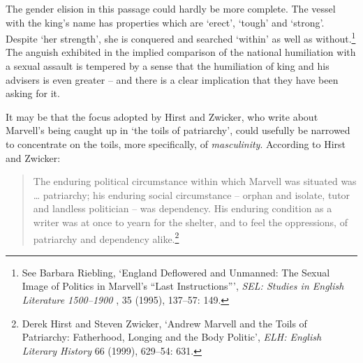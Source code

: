 ﻿\documentclass[12pt]{article}
\newcommand{\citedtitle}[1]{\textit{#1}}
\begin{document}
The
gender elision in this passage could hardly be more complete. The vessel with
the king’s name has properties which are ‘erect’, ‘tough’ and ‘strong’. Despite
‘her strength’, she is conquered and searched ‘within’ as well as without.\footnote{See Barbara Riebling,
‘England Deflowered and Unmanned: The Sexual Image of Politics in Marvell’s
“Last Instructions”’, \citedtitle{SEL: Studies in English Literature
1500–1900 }, 35 (1995), 137–57: 149.} The
anguish exhibited in the implied comparison of the national humiliation with a
sexual assault is tempered by a sense that the humiliation of king and his
advisers is even greater – and there is a clear implication that they have been
asking for it.

It
may be that the focus adopted by Hirst and Zwicker, who write about Marvell’s
being caught up in ‘the toils of patriarchy’, could usefully be narrowed to
concentrate on the toils, more specifically, of \emph{masculinity}. According to Hirst and
Zwicker:

\begin{quote}
The enduring political circumstance within which Marvell was situated was …
patriarchy; his enduring social circumstance – orphan and isolate, tutor and
landless politician – was dependency. His enduring condition as a writer was at
once to yearn for the shelter, and to feel the oppressions, of patriarchy and dependency
alike.\footnote{Derek Hirst and Steven Zwicker, ‘Andrew Marvell and the Toils of Patriarchy: Fatherhood, Longing and
the Body Politic’, \citedtitle{ELH: English Literary History} 66 (1999), 629–54: 631.}
\end{quote}
\end{document}
